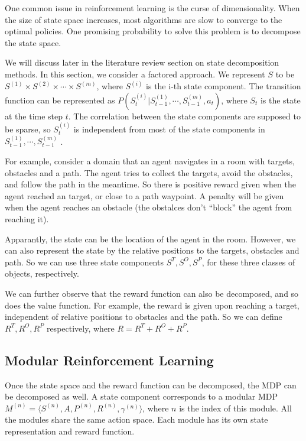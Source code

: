 \documentclass[12pt]{report}	%
\theoremstyle{definition}
\theoremstyle{remark}
\begin{document}
One common issue in reinforcement learning is the curse of dimensionality. 
When the size of state space increases, most algorithms are slow to 
converge to the optimal policies. One promising probability to solve this
problem is to decompose the state space. 

We will discuss later in the literature review section on state decomposition
methods.
In this section, we consider a factored approach.
We represent $S$ to be $S^{(1)} \times S^{(2)} \times \cdots \times S^{(m)}$,
where $S^{(i)}$ is the i-th state component. The transition function can be
represented as $P(S_t^{(i)}|S_{t-1}^{(1)}, \cdots, S_{t-1}^{(m)}, a_t)$, where
$S_t$ is the state at the time step $t$. The correlation between the state
components are supposed to be sparse, so $S_t^{(i)}$  is independent from most
of the state components in $S_{t-1}^{(1)}, \cdots, S_{t-1}^{(m)}$ \cite{jonsson2005causal}.

For example, consider a domain that an agent navigates in a room with targets,
obstacles and a path. The agent tries to collect the targets, avoid the
obstacles, and follow the path in the meantime. So there is positive reward
given when the agent reached an target, or close to a path waypoint. A penalty
will be given when the agent reaches an obstacle (the obstalces don't ``block''
the agent from reaching it).

Apparantly, the state can be the location
of the agent in the room. However, we can also represent the state by the
relative positions to the targets, obstacles and path. So we can use three state
components $S^T, S^O, S^P$, for these three classes of objects, respectively.

We can further observe that the reward function can also be decomposed, and
so does the value function. For example, the reward is given upon reaching a
target, independent of relative positions to obstacles and the path. So we can
define $R^T, R^O, R^P$ respectively, where $R = R^T + R^O + R^P$.

\subsection{Modular Reinforcement Learning}

Once the state space and the reward function can be decomposed, the MDP can be
decomposed as well.  A state component corresponds to a modular MDP
$M^{(n)}=\langle S^{(n)},A,P^{(n)},R^{(n)},\gamma^{(n)} \rangle$, where $n$ is
the index of this module. All the modules share the same action space. Each
module has its own state representation and reward function.
\cite{sprague2003multiple}
\end{document}
